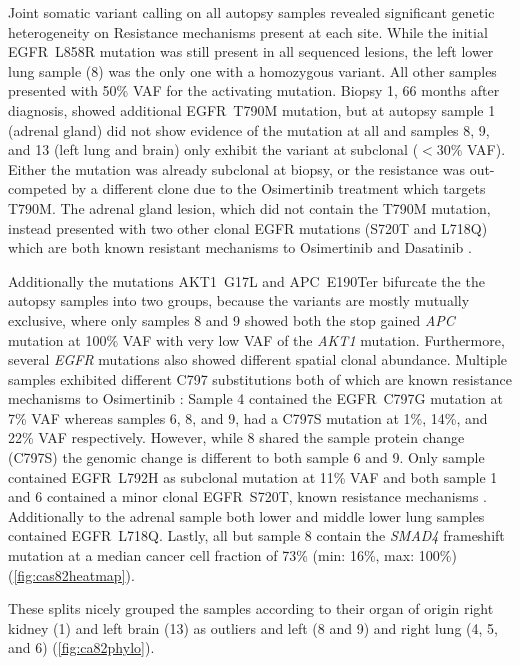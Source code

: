 Joint somatic variant calling on all autopsy samples revealed significant genetic heterogeneity on Resistance mechanisms present at each site. While the initial EGFR~L858R mutation was still present in all sequenced lesions, the left lower lung sample (8) was the only one with a homozygous variant. All other samples presented with 50\% VAF for the activating mutation. Biopsy 1, 66 months after diagnosis, showed additional EGFR~T790M mutation, but at autopsy sample 1 (adrenal gland) did not show evidence of the mutation at all and samples 8, 9, and 13 (left lung and brain) only exhibit the variant at subclonal ($<30\%$ VAF). Either the mutation was already subclonal at biopsy, or the resistance was out-competed by a different clone due to the Osimertinib treatment which targets T790M. The adrenal gland lesion, which did not contain the T790M mutation, instead presented with two other clonal EGFR mutations (S720T and L718Q) which are both known resistant mechanisms to Osimertinib and Dasatinib \cite{Johnson2010,Bersanelli2016}.

Additionally the mutations AKT1~G17L and APC~E190Ter bifurcate the the autopsy samples into two groups, because the variants are mostly mutually exclusive, where only samples 8 and 9 showed both the stop gained \textit{APC} mutation at 100\% VAF with very low VAF of the \textit{AKT1} mutation. Furthermore, several \textit{EGFR} mutations also showed different spatial clonal abundance. Multiple samples exhibited different C797 substitutions both of which are known resistance mechanisms to Osimertinib \cite{Wang2016,Leonetti2019}: Sample 4 contained the EGFR~C797G mutation at 7\% VAF whereas samples 6, 8, and 9, had a C797S mutation at 1\%, 14\%, and 22\% VAF respectively. However, while 8 shared the sample protein change (C797S) the genomic change is different to both sample 6 and 9. Only sample contained EGFR~L792H as subclonal mutation at 11\% VAF and both sample 1 and 6 contained a minor clonal EGFR~S720T, known resistance mechanisms \cite{Johnson2010,Zhang2018b}. Additionally to the adrenal sample both lower and middle lower lung samples contained EGFR~L718Q. 
Lastly, all but sample 8 contain the \textit{SMAD4} frameshift mutation at a median cancer cell fraction of 73\% (min: 16\%, max: 100\%) (\autoref{fig:cas82heatmap}).

These splits nicely grouped the samples according to their organ of origin right kidney (1) and left brain (13) as outliers and left (8 and 9) and right lung (4, 5, and 6) (\autoref{fig:ca82phylo}).


